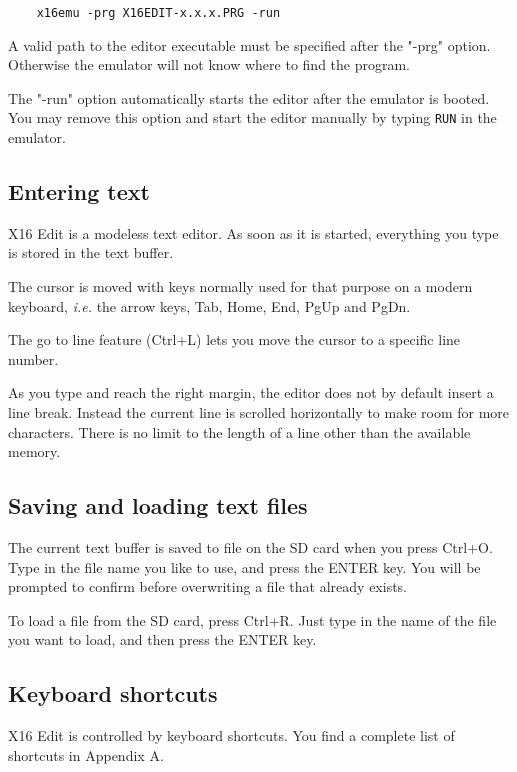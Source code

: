 \documentclass{article}
\begin{document}
\begin{verbatim}
    x16emu -prg X16EDIT-x.x.x.PRG -run
\end{verbatim}

        A valid path to the editor executable must be specified after
        the "-prg" option. Otherwise the emulator will not know where
        to find the program.
 
        The "-run" option automatically starts the editor after the emulator
        is booted. You may remove this option and start the editor manually
        by typing \texttt{RUN} in the emulator.
 
    \subsection{Entering text}
        X16 Edit is a modeless text editor. As soon as it is started, everything
        you type is stored in the text buffer.
 
        The cursor is moved with keys normally used for that purpose on a modern
        keyboard, \textit{i.e.} the arrow keys, Tab, Home, End, PgUp and PgDn.

        The go to line feature (Ctrl+L) lets you move the cursor to a specific line number.
 
        As you type and reach the right margin, the editor does not by default insert a line break. 
        Instead the current line is scrolled horizontally to
        make room for more characters. There is no limit to the length of a line
        other than the available memory.
 
    \subsection{Saving and loading text files}
        The current text buffer is saved to file on the SD card when you press Ctrl+O. Type in the 
        file name you like to use, and press the ENTER key. You will
        be prompted to confirm before overwriting a file that already exists.
         
        To load a file from the SD card, press Ctrl+R. 
        Just type in the name of the file you want to load, and then press the ENTER key.
        
    \subsection{Keyboard shortcuts}
        X16 Edit is controlled by keyboard shortcuts. You find a complete list
        of shortcuts in Appendix A.
\end{document}
